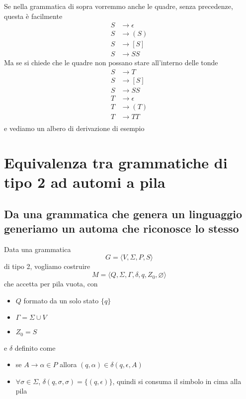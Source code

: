 \documentclass[12pt]{article}
\begin{document}
\begin{tcolorbox}
	Se nella grammatica di sopra vorremmo anche le quadre, senza precedenze, questa è facilmente
	\begin{align*}
		S &\rightarrow \epsilon \\
		S &\rightarrow ( S ) \\
		S &\rightarrow [ S ] \\
		S &\rightarrow S S
	\end{align*}
	Ma se si chiede che le quadre non possano stare all'interno delle tonde
	\begin{align*}
		S &\rightarrow T \\
		S &\rightarrow [ S ] \\
		S &\rightarrow S S \\
		T &\rightarrow \epsilon \\
		T &\rightarrow ( T ) \\
		T &\rightarrow T T \\
	\end{align*}
	e vediamo un albero di derivazione di esempio
	\begin{center}
	\end{center}
\end{tcolorbox}

\section{Equivalenza tra grammatiche di tipo 2 ad automi a pila}
\subsection{Da una grammatica che genera un linguaggio generiamo un automa che riconosce lo stesso}
Data una grammatica
$$ G = \langle V, \Sigma, P, S \rangle $$
di tipo 2, vogliamo costruire
$$ M = \langle Q, \Sigma, \Gamma, \delta, q, Z_0, \varnothing \rangle $$
che accetta per pila vuota, con
\begin{itemize}
	\item $Q$ formato da un solo stato $\{q\}$
	\item $\Gamma = \Sigma \cup V$
	\item $Z_0 = S$
\end{itemize}
e $\delta$ definito come
\begin{itemize}
	\item se $A \rightarrow \alpha \in P$ allora $(q, \alpha) \in \delta(q, \epsilon, A)$
	\item $\forall \sigma \in \Sigma$, $\delta(q, \sigma, \sigma) = \{ (q, \epsilon) \}$, quindi si consuma il simbolo in cima alla pila
\end{itemize}
\end{document}
